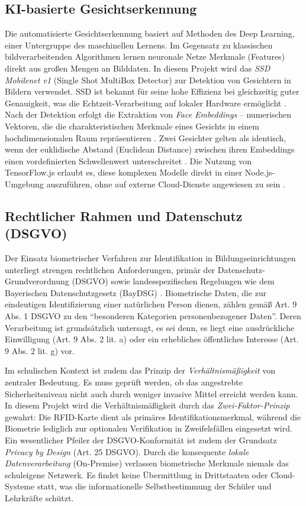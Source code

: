 \subsection{KI-basierte Gesichtserkennung} \label{subsec:gesichtserkennung}
Die automatisierte Gesichtserkennung basiert auf Methoden des Deep Learning, einer Untergruppe des maschinellen Lernens. Im Gegensatz zu klassischen bildverarbeitenden Algorithmen lernen neuronale Netze Merkmale (Features) direkt aus großen Mengen an Bilddaten. In diesem Projekt wird das \textit{SSD Mobilenet v1} (Single Shot MultiBox Detector) zur Detektion von Gesichtern in Bildern verwendet. SSD ist bekannt für seine hohe Effizienz bei gleichzeitig guter Genauigkeit, was die Echtzeit-Verarbeitung auf lokaler Hardware ermöglicht \autocite{vladmandic2023faceapi}. Nach der Detektion erfolgt die Extraktion von \textit{Face Embeddings} – numerischen Vektoren, die die charakteristischen Merkmale eines Gesichts in einem hochdimensionalen Raum repräsentieren \autocite{schroff2015facenet}. Zwei Gesichter gelten als identisch, wenn der euklidische Abstand (Euclidean Distance) zwischen ihren Embeddings einen vordefinierten Schwellenwert unterschreitet \autocite{goodfellow2016deep}. Die Nutzung von TensorFlow.js erlaubt es, diese komplexen Modelle direkt in einer Node.js-Umgebung auszuführen, ohne auf externe Cloud-Dienste angewiesen zu sein \autocite{tensorflow2023}.

\subsection{Rechtlicher Rahmen und Datenschutz (DSGVO)} \label{subsec:datenschutz}
Der Einsatz biometrischer Verfahren zur Identifikation in Bildungseinrichtungen unterliegt strengen rechtlichen Anforderungen, primär der Datenschutz-Grundverordnung (DSGVO) sowie landesspezifischen Regelungen wie dem Bayerischen Datenschutzgesetz (BayDSG) \autocite{dsgvo2016, baydsg}. Biometrische Daten, die zur eindeutigen Identifizierung einer natürlichen Person dienen, zählen gemäß Art. 9 Abs. 1 DSGVO zu den \enquote{besonderen Kategorien personenbezogener Daten}. Deren Verarbeitung ist grundsätzlich untersagt, es sei denn, es liegt eine ausdrückliche Einwilligung (Art. 9 Abs. 2 lit. a) oder ein erhebliches öffentliches Interesse (Art. 9 Abs. 2 lit. g) vor.

Im schulischen Kontext ist zudem das Prinzip der \textit{Verhältnismäßigkeit} von zentraler Bedeutung. Es muss geprüft werden, ob das angestrebte Sicherheitsniveau nicht auch durch weniger invasive Mittel erreicht werden kann. In diesem Projekt wird die Verhältnismäßigkeit durch das \textit{Zwei-Faktor-Prinzip} gewahrt: Die RFID-Karte dient als primäres Identifikationsmerkmal, während die Biometrie lediglich zur optionalen Verifikation in Zweifelsfällen eingesetzt wird. Ein wesentlicher Pfeiler der DSGVO-Konformität ist zudem der Grundsatz \textit{Privacy by Design} (Art. 25 DSGVO). Durch die konsequente \textit{lokale Datenverarbeitung} (On-Premise) verlassen biometrische Merkmale niemals das schuleigene Netzwerk. Es findet keine Übermittlung in Drittstaaten oder Cloud-Systeme statt, was die informationelle Selbstbestimmung der Schüler und Lehrkräfte schützt.


